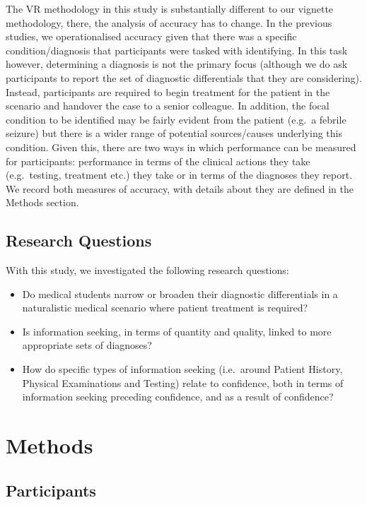 \documentclass[a4paper, nobind]{templates/ociamthesis}
\providecommand{\tightlist}{%
  \setlength{\itemsep}{0pt}\setlength{\parskip}{0pt}}
\begin{document}
\hfill\break
The VR methodology in this study is substantially different to our vignette methodology, there, the analysis of accuracy has to change. In the previous studies, we operationalised accuracy given that there was a specific condition/diagnosis that participants were tasked with identifying. In this task however, determining a diagnosis is not the primary focus (although we do ask participants to report the set of diagnostic differentials that they are considering). Instead, participants are required to begin treatment for the patient in the scenario and handover the case to a senior colleague. In addition, the focal condition to be identified may be fairly evident from the patient (e.g.~a febrile seizure) but there is a wider range of potential sources/causes underlying this condition. Given this, there are two ways in which performance can be measured for participants: performance in terms of the clinical actions they take (e.g.~testing, treatment etc.) they take or in terms of the diagnoses they report. We record both measures of accuracy, with details about they are defined in the Methods section.

\subsection{Research Questions}\label{research-questions-2}

With this study, we investigated the following research questions:

\begin{itemize}
\tightlist
\item
  Do medical students narrow or broaden their diagnostic differentials in a naturalistic medical scenario where patient treatment is required?
\item
  Is information seeking, in terms of quantity and quality, linked to more appropriate sets of diagnoses?
\item
  How do specific types of information seeking (i.e.~around Patient History, Physical Examinations and Testing) relate to confidence, both in terms of information seeking preceding confidence, and as a result of confidence?
\end{itemize}

\section{Methods}\label{methods-3}

\subsection{Participants}\label{participants-2}
\end{document}
